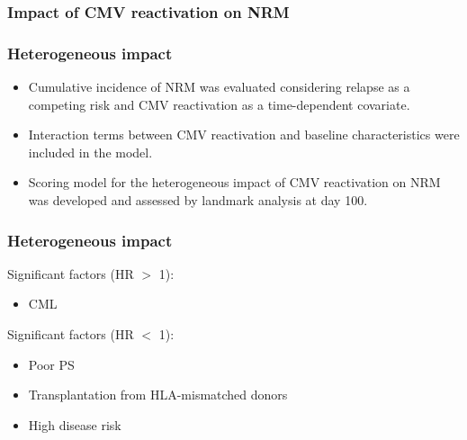 \documentclass[14pt]{beamer}
\begin{document}
	\begin{frame}
	\frametitle{Impact of CMV reactivation on NRM}
	\end{frame}

	\begin{frame}
	\frametitle{Heterogeneous impact}
	\begin{itemize}
	\item Cumulative incidence of NRM was evaluated considering relapse as a competing risk and CMV reactivation as a time-dependent covariate.
	\item Interaction terms between CMV reactivation and baseline characteristics were included in the model.
	\item Scoring model for the heterogeneous impact of CMV reactivation on NRM was developed and assessed by landmark analysis at day 100.

	\end{itemize}
	\end{frame}

	\begin{frame}
	\frametitle{Heterogeneous impact}
	Significant factors (HR $>$ 1):
	\begin{itemize}
	\item CML

	\end{itemize}
	Significant factors (HR $<$ 1):
	\begin{itemize}
	\item Poor PS
	\item Transplantation from HLA-mismatched donors
	\item High disease risk

	\end{itemize}

	\end{frame}
\end{document}
